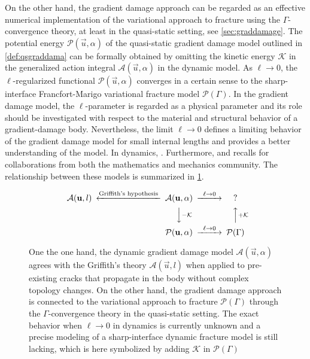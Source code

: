 On the other hand, the gradient damage approach can be regarded as an effective numerical implementation of the variational approach to fracture using the $\Gamma$-convergence theory, at least in the quasi-static setting, see \cref{sec:graddamage}. The potential energy $\mathcal{P}(\vec{u},\alpha)$ of the quasi-static gradient damage model outlined in \cref{def:qsgraddama} can be formally obtained by omitting the kinetic energy $\mathcal{K}$ in the generalized action integral $\mathcal{A}(\vec{u},\alpha)$ in the dynamic model. As $\ell\to 0$, the $\ell$-regularized functional $\mathcal{P}(\vec{u},\alpha)$ converges in a certain sense to the sharp-interface Francfort-Marigo variational fracture model $\mathcal{P}(\Gamma)$. In the gradient damage model, the $\ell$-parameter is regarded as a physical parameter and its role should be investigated with respect to the material and structural behavior of a gradient-damage body. Nevertheless, the limit $\ell\to 0$ defines a limiting behavior of the gradient damage model for small internal lengths and provides a better understanding of the model. In dynamics, . Furthermore,  and recalls for collaborations from both the mathematics and mechanics community. The relationship between these models is summarized in \cref{fig:griffithvariagraddama}.
\begin{figure}[htbp]
\centering
\[
\begin{CD}
\mathcal{A}(\vec{u},l) @<\text{Griffith's hypothesis}<< \mathcal{A}(\vec{u},\alpha) @>{\ell\to 0}>> ? \\
@. @VV{-\mathcal{K}}V @AA{+\mathcal{K}}A \\
@. \mathcal{P}(\vec{u},\alpha) @>{\ell\to 0}>> \mathcal{P}(\Gamma)
\end{CD}
\]
\caption{One the one hand, the dynamic gradient damage model $\mathcal{A}(\vec{u},\alpha)$ agrees with the Griffith's theory $\mathcal{A}(\vec{u},l)$ when applied to pre-existing cracks that propagate in the body without complex topology changes. On the other hand, the gradient damage approach is connected to the variational approach to fracture $\mathcal{P}(\Gamma)$ through the $\Gamma$-convergence theory in the quasi-static setting. The exact behavior when $\ell\to 0$ in dynamics is currently unknown and a precise modeling of a sharp-interface dynamic fracture model is still lacking, which is here symbolized by adding $\mathcal{K}$ in $\mathcal{P}(\Gamma)$} \label{fig:griffithvariagraddama}
\end{figure}

